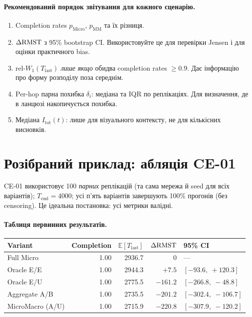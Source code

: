 \documentclass[11pt,a4paper]{article}
\begin{document}
\paragraph{Рекомендований порядок звітування для кожного сценарію.}
\begin{enumerate}
  \item Completion rates $p_{\mathrm{Micro}}$, $p_{\mathrm{MM}}$ та їх
        різниця.
  \item $\Delta\mathrm{RMST}$ з 95\% bootstrap CI.  Використовуйте це для перевірки Jensen і для
        оцінки практичного bias.
  \item rel-$W_1(T_{\mathrm{last}})$ \emph{лише якщо} обидва completion rates
        $\geq 0.9$.  Дає інформацію про форму розподілу поза середнім.
  \item Per-hop парна похибка $\delta_i$: медіана та IQR по реплікаціях.
        Для визначення, де в ланцюзі накопичується похибка.
  \item Медіана $I_{\mathrm{tot}}(t)$: лише для візуального контексту, не для
        кількісних висновків.
\end{enumerate}

\section{Розібраний приклад: абляція CE-01}

CE-01 використовує 100 \emph{парних} реплікацій (та сама мережа й seed для всіх
варіантів); $T_{\mathrm{end}} = 4000$; усі п'ять варіантів завершують 100\%
прогонів (без censoring).  Це ідеальна постановка: усі метрики валідні.

\paragraph{Таблиця первинних результатів.}
\begin{center}
\begin{tabular}{lrrrl}
\toprule
Variant & Completion & $\mathbb{E}[T_{\mathrm{last}}]$ & $\Delta\mathrm{RMST}$ & 95\% CI \\
\midrule
Full Micro         & 1.00 & 2936.7 & $0$       & --- \\
Oracle E/E         & 1.00 & 2944.3 & $+7.5$    & $[-93.6,\;+120.3]$ \\
Oracle E/U         & 1.00 & 2775.5 & $-161.2$  & $[-266.8,\;-48.8]$ \\
Aggregate A/B      & 1.00 & 2735.5 & $-201.2$  & $[-302.4,\;-106.7]$ \\
MicroMacro (A/U)   & 1.00 & 2715.9 & $-220.8$  & $[-307.9,\;-120.2]$ \\
\bottomrule
\end{tabular}
\end{center}
\end{document}
